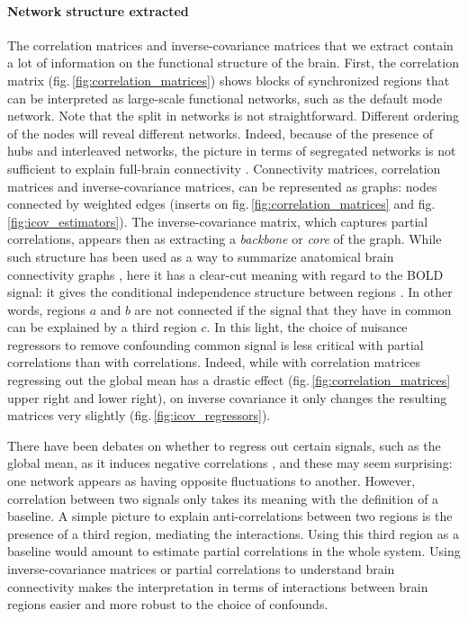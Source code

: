 \documentclass[5p]{elsarticle}
\begin{document}
\paragraph{Network structure extracted}
%
The correlation matrices and inverse-covariance matrices that we extract
contain a lot of information on the functional structure of the brain.
First, the correlation matrix (fig.\,\ref{fig:correlation_matrices})
shows blocks of synchronized regions that can be interpreted as
large-scale functional networks, such as the default mode network. Note
that the split in networks is not straightforward. Different ordering of the
nodes will reveal different networks. 
Indeed, because of the presence of
hubs and interleaved networks, the picture in terms of segregated networks
is not sufficient to explain full-brain connectivity
\cite{varoquaux2012}. Connectivity matrices, correlation matrices and
inverse-covariance matrices, can be represented as graphs: nodes connected
by weighted edges (inserts on fig.\,\ref{fig:correlation_matrices} and
fig.\,\ref{fig:icov_estimators}). The inverse-covariance matrix, which
captures partial correlations, appears then as extracting a
\emph{backbone} or \emph{core} of the graph.
While such structure has
been used as a way to summarize anatomical brain connectivity graphs
\cite{hagmann2008}, here it has a clear-cut meaning with regard to
the BOLD signal: it gives the conditional independence structure between
regions \cite{varoquaux2012}. In other words, regions $a$ and $b$ are
not connected if the signal that they have in common can be explained by
a third region $c$. In this light, the choice of nuisance regressors to
remove confounding common signal is less critical with partial
correlations than with correlations. Indeed, while with
correlation matrices regressing out the global mean has a drastic effect
(fig.\,\ref{fig:correlation_matrices} upper right and lower right), on
inverse covariance it only changes the resulting matrices very slightly 
(fig.\,\ref{fig:icov_regressors}).

There have been debates on whether to
regress out certain signals, such as the global mean,  as it induces
negative correlations \cite{murphy2009,chang2009,fox2009}, and these may seem
surprising: one network appears as having opposite fluctuations to
another. However,
correlation between two signals only takes its meaning with the
definition of a baseline. A simple picture to explain anti-correlations
between two regions is the presence of a third region, mediating the
interactions. Using this third region as a baseline would amount to
estimate partial correlations in the whole system. Using 
inverse-covariance matrices or partial correlations to understand brain
connectivity makes the interpretation in terms of interactions between
brain regions easier and more robust to the choice of confounds.
\end{document}
